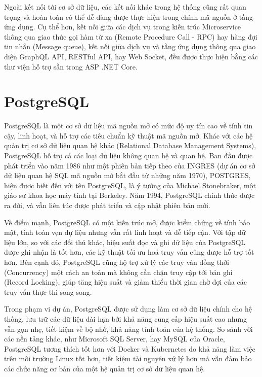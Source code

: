 \documentclass[../DoAn.tex]{subfiles}
\begin{document}
Ngoài kết nối tới cơ sở dữ liệu, các kết nối khác trong hệ thống cũng rất quan trọng và hoàn toàn có thể dễ dàng được thực hiện trong chính mã nguồn
ở tầng ứng dụng. Cụ thể hơn, kết nối giữa các dịch vụ trong kiến trúc Microservice thông qua giao thức gọi hàm từ xa (Remote Procedure Call - RPC) hay hàng đợi tin nhắn (Message queue),
kết nối giữa dịch vụ và tầng ứng dụng thông qua giao diện GraphQL API, RESTful API, hay Web Socket, đều được thực hiện bằng các thư viện hỗ trợ sẵn
trong ASP .NET Core.


\section{PostgreSQL}
\label{section:3.4}
PostgreSQL là một cơ sở dữ liệu mã nguồn mở có mức độ uy tín cao về tính tin cậy, linh hoạt, và hỗ trợ các tiêu chuẩn kỹ thuật mã nguồn mở.
Khác với các hệ quản trị cơ sở dữ liệu quan hệ khác (Relational Database Management Systems), PostgreSQL hỗ trợ cả các loại dữ liệu không quan hệ
và quan hệ. Ban đầu được phát triển vào năm 1986 như một phiên bản tiếp theo của INGRES (dự án cơ sở dữ liệu quan hệ SQL mã nguồn mở bắt đầu từ những năm 1970),
POSTGRES, hiện được biết đến với tên PostgreSQL, là ý tưởng của Michael Stonebraker, một giáo sư khoa học máy tính tại Berkeley. Năm 1994, PostgreSQL chính thức
được ra đời, và vẫn liên túc được phát triển và cập nhật phiên bản mới.

Về điểm mạnh, PostgreSQL có một kiến trúc mở, được kiểm chứng về tính bảo mật, tính toàn vẹn dự liệu nhưng vẫn rất linh hoạt và dễ tiếp cận. Với tập
dữ liệu lớn, so với các đối thủ khác, hiệu suất đọc và ghi dữ liệu của PostgreSQL được ghi nhận là tốt hơn, các kỹ thuật tối ưu hoá truy vấn
cũng được hỗ trợ tốt hơn. Bên cạnh đó, PostgreSQL cũng hộ trợ xử lý các truy vân đồng thời (Concurrency) một cách an toàn mà không cần chặn
truy cập tới bản ghi (Record Locking), giúp tăng hiệu suất và giảm thiểu thời gian chờ đợi của các truy vấn thực thi song song.

Trong phạm vi dự án, PostgreSQL được sử dụng làm cơ sở dữ liệu chính cho hệ thống, lưu trữ các dữ liệu dài hạn bởi khả năng cung cấp hiệu suất cao
nhưng vẫn gọn nhẹ, tiết kiệm về bộ nhớ, khả năng tính toán của hệ thống. So sánh với các nền tảng khác, như Microsoft SQL Server, hay MySQL của Oracle,
PostgreSQL tương thích tốt hơn với Docker và Kubernetes do khả năng làm việc trên môi trường Linux tốt hơn, tiết kiệm tài nguyên xử lý hơn mà
vẫn đảm bảo các chức năng cơ bản của một hệ quản trị cơ sở dữ liệu quan hệ.
\end{document}
